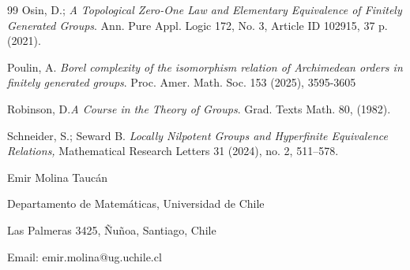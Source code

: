 \documentclass[12pt]{article}
\theoremstyle{definition}
\begin{document}
\begin{thebibliography}{99}
Osin, D.; {\it A Topological Zero-One Law and Elementary Equivalence of Finitely Generated Groups}. Ann. Pure Appl. Logic 172, No. 3, Article ID 102915, 37 p. (2021).

Poulin, A. {\it Borel complexity of the isomorphism relation of Archimedean orders in finitely generated groups}. Proc. Amer. Math. Soc. 153 (2025), 3595-3605


Robinson, D.{\it A Course in the Theory of Groups}. Grad. Texts Math. 80, (1982).

Schneider, S.; Seward B. {\it Locally Nilpotent Groups and Hyperfinite Equivalence Relations,} Mathematical Research Letters 31 (2024), no. 2, 511–578.






\end{thebibliography}

Emir Molina Taucán

Departamento de Matemáticas, Universidad de Chile

Las Palmeras 3425, Ñuñoa, Santiago, Chile

Email: emir.molina@ug.uchile.cl
\end{document}
